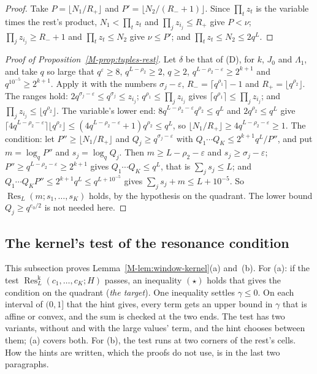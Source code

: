 \documentclass[11pt]{article}
\numberwithin{equation}{section}
\begin{document}
\begin{proof}
Take $P = \lfloor N_1/R_+ \rfloor$ and $P' = \lfloor N_2/(R_- + 1) \rfloor$. Since $\prod_t z_t$ is the variable times
the rest's product, $N_1 < \prod_t z_t$ and $\prod_j z_{i_j} \le R_+$ give $P < \nu$; $\prod_j z_{i_j} \ge R_- + 1$ and
$\prod_t z_t \le N_2$ give $\nu \le P'$; and $\prod_t z_t \le N_2 \le 2q^L$.
\end{proof}

\begin{proof}[Proof of Proposition~\ref{M-prop:tuples-rest}]
Let $\delta$ be that of (D), for $k$, $J_0$ and $\Lambda_1$, and take $q$ so
large that $q^\varepsilon \ge 8$, $q^{L - \rho_2} \ge 2$, $q \ge 2$, $q^{L - \rho_2 - \varepsilon} \ge 2^{k + 1}$ and
$q^{10^{-5}} \ge 2^{k + 1}$. Apply it with the numbers $\sigma_j - \varepsilon$, $R_- = \lceil q^{\rho_1} \rceil - 1$
and $R_+ = \lfloor q^{\rho_2} \rfloor$. The ranges hold: $2q^{\sigma_j - \varepsilon} \le q^{\sigma_j} \le z_{i_j}$;
$q^{\rho_1} \le \prod_j z_{i_j}$ gives $\lceil q^{\rho_1} \rceil \le \prod_j z_{i_j}$; and $\prod_j z_{i_j} \le
\lfloor q^{\rho_2} \rfloor$. The variable's lower end: $8 q^{L - \rho_2 - \varepsilon} q^{\rho_2} \le q^L$ and $2
q^{\rho_2} \le q^L$ give $\lceil 4 q^{L - \rho_2 - \varepsilon} \rceil \lfloor q^{\rho_2} \rfloor \le (4 q^{L - \rho_2 -
\varepsilon} + 1) q^{\rho_2} \le q^L$, so $\lfloor N_1/R_+ \rfloor \ge 4 q^{L - \rho_2 - \varepsilon} \ge 1$. The
condition: let $P'' \ge \lfloor N_1/R_+ \rfloor$ and $Q_j \ge q^{\sigma_j - \varepsilon}$ with $Q_1 \cdots Q_K \le
2^{k + 1} q^L/P''$, and put $m = \log_q P''$ and $s_j = \log_q Q_j$. Then $m \ge L - \rho_2 - \varepsilon$ and $s_j \ge
\sigma_j - \varepsilon$; $P'' \ge q^{L - \rho_2 - \varepsilon} \ge 2^{k + 1}$ gives $Q_1 \cdots Q_K \le q^L$, that is
$\sum_j s_j \le L$; and $Q_1 \cdots Q_K P'' \le 2^{k + 1} q^L \le q^{L + 10^{-5}}$ gives $\sum_j s_j + m \le L +
10^{-5}$. So $\operatorname{Res}_L(m; s_1, \dots, s_K)$ holds, by the hypothesis on the quadrant. The lower bound $Q_j
\ge q^{e_0/2}$ is not needed here.
\end{proof}

\subsection*{The kernel's test of the resonance condition}

This subsection proves Lemma~\ref{M-lem:window-kernel}(a) and~(b). For (a): if the test
$\operatorname{Res}^{\mathrm k}_L(c_1, \dots, c_K; H)$ passes, an inequality $(\star)$ holds that gives the condition on
the quadrant (\emph{the target}). One inequality settles $\gamma \le 0$. On each interval of $(0, 1]$ that the hint
gives, every term gets an upper bound in $\gamma$ that is affine or convex, and the sum is checked at the two ends. The
test has two variants, without and with the large values' term, and the hint chooses between them; (a) covers both.
For (b), the test runs at two corners of the rest's cells. How the hints are written, which the proofs do not use, is
in the last two paragraphs.
\end{document}
